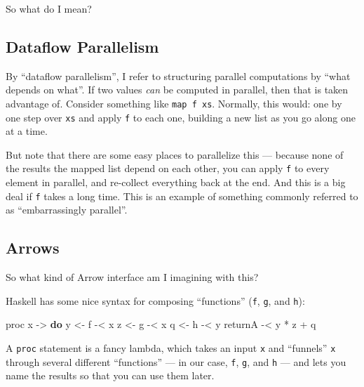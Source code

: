 \documentclass[]{article}
\newenvironment{Shaded}{}{}
\newcommand{\KeywordTok}[1]{\textcolor[rgb]{0.00,0.44,0.13}{\textbf{#1}}}
\newcommand{\NormalTok}[1]{#1}
\newcommand{\OperatorTok}[1]{\textcolor[rgb]{0.40,0.40,0.40}{#1}}
\newcommand{\OtherTok}[1]{\textcolor[rgb]{0.00,0.44,0.13}{#1}}
\begin{document}
So what do I mean?

\hypertarget{dataflow-parallelism}{%
\subsection{Dataflow Parallelism}\label{dataflow-parallelism}}

By ``dataflow parallelism'', I refer to structuring parallel computations by
``what depends on what''. If two values \emph{can} be computed in parallel, then
that is taken advantage of. Consider something like \texttt{map\ f\ xs}.
Normally, this would: one by one step over \texttt{xs} and apply \texttt{f} to
each one, building a new list as you go along one at a time.

But note that there are some easy places to parallelize this --- because none of
the results the mapped list depend on each other, you can apply \texttt{f} to
every element in parallel, and re-collect everything back at the end. And this
is a big deal if \texttt{f} takes a long time. This is an example of something
commonly referred to as ``embarrassingly parallel''.

\hypertarget{arrows}{%
\subsection{Arrows}\label{arrows}}

So what kind of Arrow interface am I imagining with this?

Haskell has some nice syntax for composing ``functions'' (\texttt{f},
\texttt{g}, and \texttt{h}):

\begin{Shaded}
\begin{Highlighting}[]
\NormalTok{proc x }\OtherTok{{-}>} \KeywordTok{do}
\NormalTok{    y }\OtherTok{<{-}}\NormalTok{ f }\OperatorTok{{-}<}\NormalTok{ x}
\NormalTok{    z }\OtherTok{<{-}}\NormalTok{ g }\OperatorTok{{-}<}\NormalTok{ x}
\NormalTok{    q }\OtherTok{<{-}}\NormalTok{ h }\OperatorTok{{-}<}\NormalTok{ y}
\NormalTok{    returnA }\OperatorTok{{-}<}\NormalTok{ y }\OperatorTok{*}\NormalTok{ z }\OperatorTok{+}\NormalTok{ q}
\end{Highlighting}
\end{Shaded}

A \texttt{proc} statement is a fancy lambda, which takes an input \texttt{x} and
``funnels'' \texttt{x} through several different ``functions'' --- in our case,
\texttt{f}, \texttt{g}, and \texttt{h} --- and lets you name the results so that
you can use them later.
\end{document}
